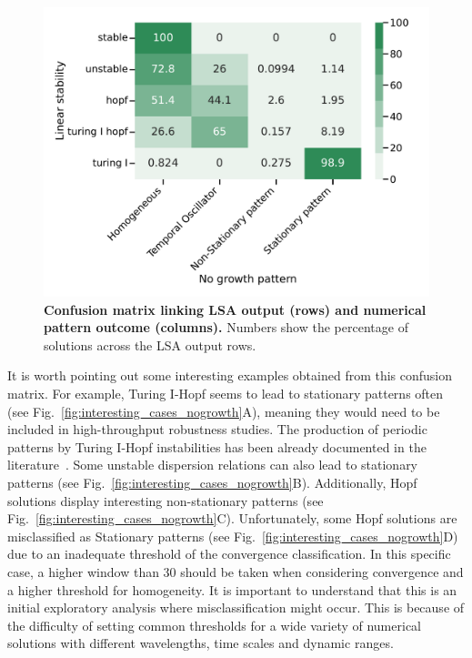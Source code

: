 \begin{figure}[H] %
    \centering
    \includegraphics[width=1\textwidth]{chapters/Chapter 1/lsa_vs_numerical_confusion_variant0-11-12} %
    \caption{\textbf{Confusion matrix linking LSA output (rows) and numerical pattern outcome (columns).} Numbers show the percentage of solutions across the LSA output rows.}
    \label{fig:lsa_numerical_confusion} %
\end{figure}

It is worth pointing out some interesting examples obtained from this confusion matrix.
For example, Turing I-Hopf seems to lead to stationary patterns often (see Fig.~\ref{fig:interesting_cases_nogrowth}A), meaning they would need to be included in high-throughput robustness studies.
The production of periodic patterns by Turing I-Hopf instabilities has been already documented in the literature~\cite{Liu2007}.
Some unstable dispersion relations can also lead to stationary patterns (see Fig.~\ref{fig:interesting_cases_nogrowth}B).
Additionally, Hopf solutions display interesting non-stationary patterns (see Fig.~\ref{fig:interesting_cases_nogrowth}C).
Unfortunately, some Hopf solutions are misclassified as Stationary patterns (see Fig.~\ref{fig:interesting_cases_nogrowth}D) due to an inadequate threshold of the convergence classification.
In this specific case, a higher window than 30 should be taken when considering convergence and a higher threshold for homogeneity.
It is important to understand that this is an initial exploratory analysis where misclassification might occur.
This is because of the difficulty of setting common thresholds for a wide variety of numerical solutions with different wavelengths, time scales and dynamic ranges.

